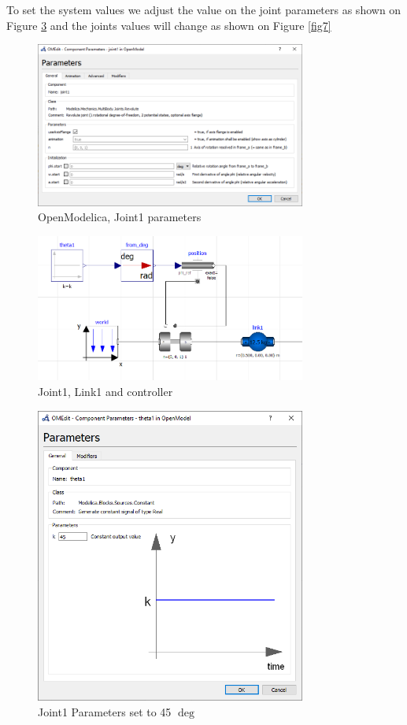 \documentclass[transmag]{IEEEtran}
\begin{document}
To set the system values we adjust the value on the joint parameters as shown on Figure \ref{fig6} and the joints values will change as shown on Figure \ref{fig7}

\begin{figure}
\centerline{\includegraphics[width=3.5in]{./images/Joint1Parameters}}
\caption{OpenModelica, Joint1 parameters\label{fig4}}
\end{figure}

\begin{figure}
\centerline{\includegraphics[width=3.5in]{./images/Joint1Link1+Controller}}
\caption{Joint1, Link1 and controller\label{fig5}}
\end{figure}



\begin{figure}
\centerline{\includegraphics[width=3.5in]{./images/theta1Parameters}}
\caption{Joint1 Parameters set to 45 $\deg$\label{fig6}}
\end{figure}
\end{document}
